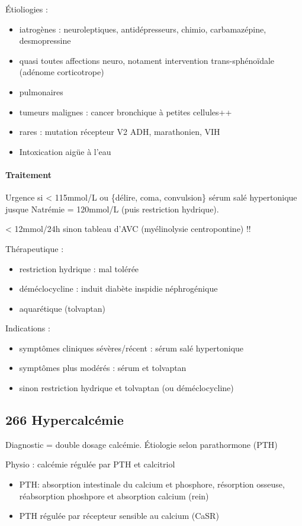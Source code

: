 \documentclass[11pt]{article}
\begin{document}
Étioliogies :
\begin{itemize}
\item iatrogènes : neuroleptiques, antidépresseurs, chimio, carbamazépine,
desmopressine
\item quasi toutes affections neuro, notament intervention trans-sphénoïdale
(adénome corticotrope)
\item pulmonaires
\item tumeurs malignes : cancer bronchique à petites cellules++
\item rares : mutation récepteur V2 ADH, marathonien, VIH
\item Intoxication aigüe à l'eau
\end{itemize}

\paragraph{Traitement}
\label{sec:orgb23461c}
Urgence si < 115mmol/L ou \{délire, coma, convulsion\}  \thus sérum salé
hypertonique jusque Natrémie = 120mmol/L (puis restriction hydrique).

\danger{} < 12mmol/24h sinon tableau d'AVC (myélinolysie centropontine) !! 

Thérapeutique :
\begin{itemize}
\item restriction hydrique : mal tolérée
\item déméclocycline : induit diabète inspidie néphrogénique
\item aquarétique (tolvaptan)
\end{itemize}

Indications :
\begin{itemize}
\item symptômes cliniques sévères/récent : sérum salé hypertonique
\item symptômes plus modérés : sérum et tolvaptan
\item sinon restriction hydrique et tolvaptan (ou déméclocycline)
\end{itemize}
\subsection{266 \textdagger{} Hypercalcémie}
\label{sec:org140c532}
Diagnostic = double dosage calcémie. Étiologie selon parathormone (PTH)

Physio : calcémie régulée par PTH et calcitriol
\begin{itemize}
\item PTH: \inc absorption intestinale du calcium et phosphore, \inc résorption
osseuse, \dec réabsorption phoshpore et \inc absorption calcium (rein)
\item PTH régulée par récepteur sensible au calcium (CaSR)
\end{itemize}
\end{document}
